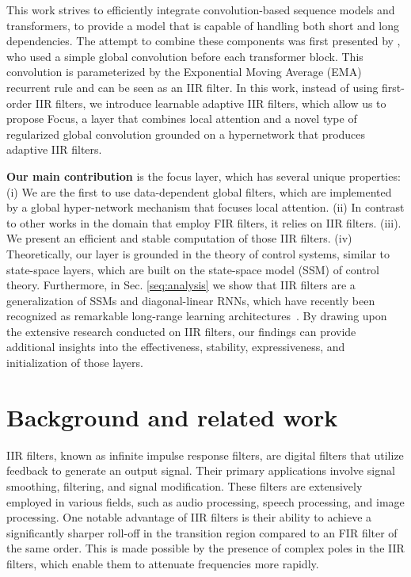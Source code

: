 \documentclass[11pt]{article}
\begin{document}
This work strives to efficiently integrate convolution-based sequence models and transformers, to provide a model that is capable of handling both short and long dependencies. The attempt to combine these components was first presented by \citet{ma2022mega}, who used a simple global convolution before each transformer block. This convolution is parameterized by the Exponential Moving Average (EMA) recurrent rule and can be seen as an IIR filter. In this work, instead of using first-order IIR filters, we introduce learnable adaptive IIR filters, which allow us to propose Focus, a layer that combines local attention and a novel type of regularized global convolution grounded on a hypernetwork that produces adaptive IIR filters.

\textbf{Our main contribution} is the focus layer, which has several unique properties: (i) We are the first to use data-dependent global filters, which are implemented by a global hyper-network mechanism that focuses local attention. (ii) In contrast to other works in the domain that employ FIR filters, it relies on IIR filters. (iii). We present an efficient and stable computation of those IIR filters. (iv) Theoretically, our layer is grounded in the theory of control systems, similar to state-space layers, which are built on the state-space model (SSM) of control theory. {Furthermore, in Sec. \ref{seq:analysis} we show that IIR filters are a generalization of SSMs and diagonal-linear RNNs, which have recently been recognized as remarkable long-range learning architectures~\cite{gupta2022diagonal,gu2022parameterization,orvieto2023resurrecting,gupta2022simplifying,saon2023diagonal,david2023decision}. By drawing upon the extensive research conducted on IIR filters, our findings can provide additional insights into the effectiveness, stability, expressiveness, and initialization of those layers.}


\section{Background and related work}
IIR filters, known as infinite impulse response filters, are digital filters that utilize feedback to generate an output signal. Their primary applications involve signal smoothing, filtering, and signal modification. These filters are extensively employed in various fields, such as audio processing, speech processing, and image processing. One notable advantage of IIR filters is their ability to achieve a significantly sharper roll-off in the transition region compared to an FIR filter of the same order. This is made possible by the presence of complex poles in the IIR filters, which enable them to attenuate frequencies more rapidly.
\end{document}
